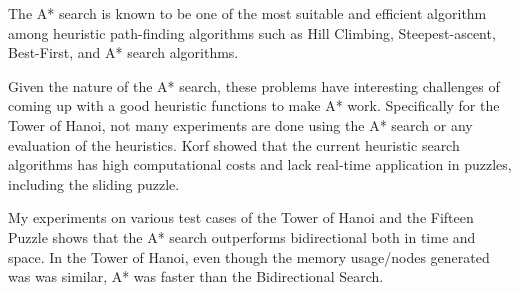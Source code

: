 \documentclass[conference]{IEEEtran}
\begin{document}
The A* search is known to be one of the most suitable and efficient algorithm among heuristic path-finding algorithms such as Hill Climbing, Steepest-ascent, Best-First, and A* search algorithms. \cite{Potdar}

Given the nature of the A* search, these problems have interesting challenges of coming up with a good heuristic functions to make A* work. Specifically for the Tower of Hanoi, not many experiments are done using the A* search or any evaluation of the heuristics. Korf showed that the current heuristic search algorithms has high computational costs and lack real-time application in puzzles, including the sliding puzzle. \cite{Korf}

My experiments on various test cases of the Tower of Hanoi and the Fifteen Puzzle shows that the A* search outperforms bidirectional both in time and space. In the Tower of Hanoi, even though the memory usage/nodes generated was was similar, A* was faster than the Bidirectional Search.





%
%


\end{document}
